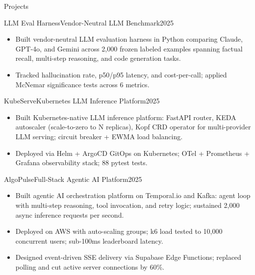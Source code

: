 \documentclass[]{mcdowellcv}
\begin{document}
\begin{cvsection}{Projects}
  \begin{cvsubsection}{LLM Eval Harness}{Vendor-Neutral LLM Benchmark}{2025}
    \begin{itemize}
      \item Built vendor-neutral LLM evaluation harness in Python comparing Claude, GPT-4o, and Gemini across 2,000 frozen labeled examples spanning factual recall, multi-step reasoning, and code generation tasks.
      \item Tracked hallucination rate, p50/p95 latency, and cost-per-call; applied McNemar significance tests across 6 metrics.
    \end{itemize}
    \vspace{-1.5pt}
  \end{cvsubsection}

  \begin{cvsubsection}{KubeServe}{Kubernetes LLM Inference Platform}{2025}
    \begin{itemize}
      \item Built Kubernetes-native LLM inference platform: FastAPI router, KEDA autoscaler (scale-to-zero to N replicas), Kopf CRD operator for multi-provider LLM serving; circuit breaker + EWMA load balancing.
      \item Deployed via Helm + ArgoCD GitOps on Kubernetes; OTel + Prometheus + Grafana observability stack; 88 pytest tests.
    \end{itemize}
    \vspace{-1.5pt}
  \end{cvsubsection}

  \begin{cvsubsection}{AlgoPulse}{Full-Stack Agentic AI Platform}{2025}
    \begin{itemize}
      \item Built agentic AI orchestration platform on Temporal.io and Kafka: agent loop with multi-step reasoning, tool invocation, and retry logic; sustained 2,000 async inference requests per second.
      \item Deployed on AWS with auto-scaling groups; k6 load tested to 10,000 concurrent users; sub-100ms leaderboard latency.
      \item Designed event-driven SSE delivery via Supabase Edge Functions; replaced polling and cut active server connections by 60\%.
    \end{itemize}
    \vspace{-1.5pt}
  \end{cvsubsection}
\end{cvsection}
\end{document}
